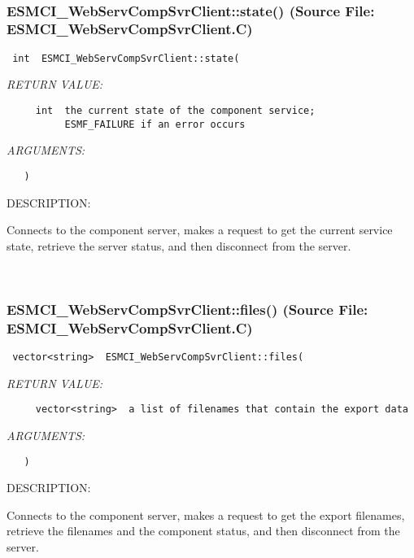  
\mbox{}\hrulefill\
 
\subsubsection{ESMCI\_WebServCompSvrClient::state() (Source File: ESMCI\_WebServCompSvrClient.C)}


  
\begin{verbatim} int  ESMCI_WebServCompSvrClient::state(\end{verbatim}{\em RETURN VALUE:}
\begin{verbatim}     int  the current state of the component service;
          ESMF_FAILURE if an error occurs\end{verbatim}{\em ARGUMENTS:}
\begin{verbatim}   )\end{verbatim}
{\sf DESCRIPTION:\\ }


      Connects to the component server, makes a request to get the current
      service state, retrieve the server status, and then disconnect from
      the server.
   
 
\mbox{}\hrulefill\
 
\subsubsection{ESMCI\_WebServCompSvrClient::files() (Source File: ESMCI\_WebServCompSvrClient.C)}


  
\begin{verbatim} vector<string>  ESMCI_WebServCompSvrClient::files(\end{verbatim}{\em RETURN VALUE:}
\begin{verbatim}     vector<string>  a list of filenames that contain the export data\end{verbatim}{\em ARGUMENTS:}
\begin{verbatim}   )\end{verbatim}
{\sf DESCRIPTION:\\ }


      Connects to the component server, makes a request to get the export
      filenames, retrieve the filenames and the component status, and then
      disconnect from the server.
   
